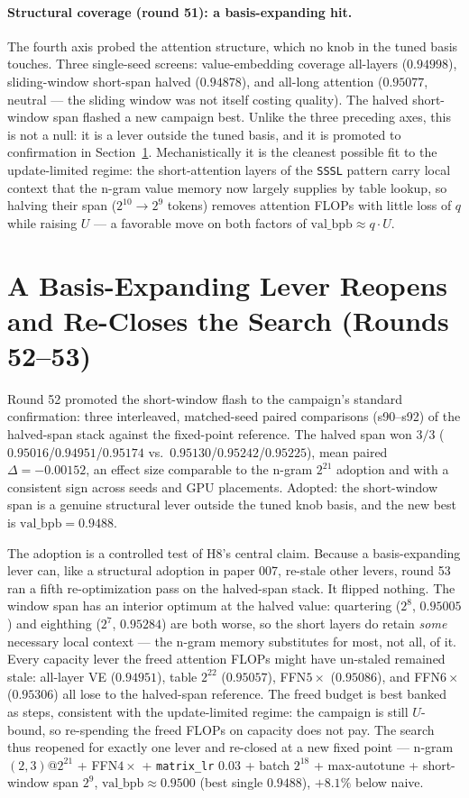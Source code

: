 \documentclass{article}
\newcommand{\valbpb}{\mathrm{val\_bpb}}
\begin{document}
\paragraph{Structural coverage (round 51): a basis-expanding hit.} The fourth axis probed the attention structure, which no knob in the tuned basis touches. Three single-seed screens: value-embedding coverage all-layers ($0.94998$), sliding-window short-span halved ($0.94878$), and all-long attention ($0.95077$, neutral --- the sliding window was not itself costing quality). The halved short-window span flashed a new campaign best. Unlike the three preceding axes, this is not a null: it is a lever outside the tuned basis, and it is promoted to confirmation in Section~\ref{sec:reopen}. Mechanistically it is the cleanest possible fit to the update-limited regime: the short-attention layers of the \texttt{SSSL} pattern carry local context that the n-gram value memory now largely supplies by table lookup, so halving their span ($2^{10}\rightarrow 2^{9}$ tokens) removes attention FLOPs with little loss of $q$ while raising $U$ --- a favorable move on both factors of $\valbpb \approx q\cdot U$.

\section{A Basis-Expanding Lever Reopens and Re-Closes the Search (Rounds 52--53)}
\label{sec:reopen}

Round 52 promoted the short-window flash to the campaign's standard confirmation: three interleaved, matched-seed paired comparisons (s90--s92) of the halved-span stack against the fixed-point reference. The halved span won $3/3$ ($0.95016$/$0.94951$/$0.95174$ vs.\ $0.95130$/$0.95242$/$0.95225$), mean paired $\Delta = -0.00152$, an effect size comparable to the n-gram $2^{21}$ adoption and with a consistent sign across seeds and GPU placements. Adopted: the short-window span is a genuine structural lever outside the tuned knob basis, and the new best is $\valbpb = 0.9488$.

The adoption is a controlled test of H8's central claim. Because a basis-expanding lever can, like a structural adoption in paper 007, re-stale other levers, round 53 ran a fifth re-optimization pass on the halved-span stack. It flipped nothing. The window span has an interior optimum at the halved value: quartering ($2^{8}$, $0.95005$) and eighthing ($2^{7}$, $0.95284$) are both worse, so the short layers do retain \emph{some} necessary local context --- the n-gram memory substitutes for most, not all, of it. Every capacity lever the freed attention FLOPs might have un-staled remained stale: all-layer VE ($0.94951$), table $2^{22}$ ($0.95057$), FFN$5\times$ ($0.95086$), and FFN$6\times$ ($0.95306$) all lose to the halved-span reference. The freed budget is best banked as steps, consistent with the update-limited regime: the campaign is still $U$-bound, so re-spending the freed FLOPs on capacity does not pay. The search thus reopened for exactly one lever and re-closed at a new fixed point --- n-gram$(2,3)$@$2^{21}$ + FFN$4\times$ + \texttt{matrix\_lr} $0.03$ + batch $2^{18}$ + max-autotune + short-window span $2^{9}$, $\valbpb \approx 0.9500$ (best single $0.9488$), $+8.1\%$ below naive.
\end{document}
